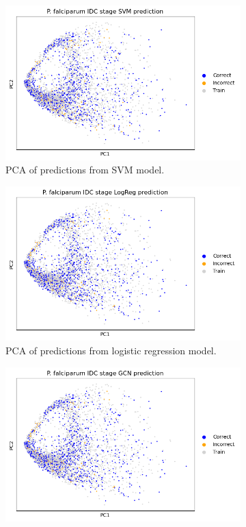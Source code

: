 \documentclass{article}
\begin{document}
\begin{figure}[!h]
  \centering
  \begin{subfigure}[b]{0.3\textwidth}
      \includegraphics[width=\textwidth]{figures/pca_Pf_prediction_SVM.png}
      \caption{PCA of predictions from SVM model.}
  \end{subfigure}
  \hfill
  \begin{subfigure}[b]{0.3\textwidth}
      \includegraphics[width=\textwidth]{figures/pca_Pf_prediction_LogReg.png}
      \caption{PCA of predictions from logistic regression model.}
  \end{subfigure}
  \hfill
  \begin{subfigure}[b]{0.3\textwidth}
      \includegraphics[width=\textwidth]{figures/pca_Pf_prediction_GCN.png}

\end{subfigure}
\end{figure}
\end{document}
